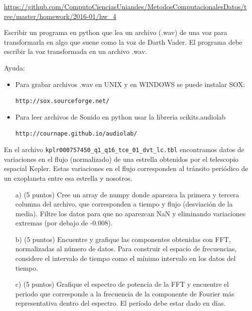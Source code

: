 \documentclass[11pt,letterpaper]{exam}
\begin{document}
\noindent
\url{https://github.com/ComputoCienciasUniandes/MetodosComputacionalesDatos/tree/master/homework/2016-01/hw_4} 
\begin{questions}




Escribir un programa en python que lea un archivo (.wav) de una
voz para transformarla en algo que suene como la voz de Darth Vader. El programa debe escribir la voz transformada en un archivo .wav.

Ayuda:
\begin{itemize}
\item Para grabar archivos .wav en UNIX y en WINDOWS  se puede
  instalar SOX:
  
  
  \verb"http://sox.sourceforge.net/"
  
\item 
  Para leer archivos de Sonido en python usar la libreria
  scikits.audiolab
  
  
 \verb"http://cournape.github.io/audiolab/"
\end{itemize}



En el archivo \texttt{kplr000757450\_q1\_q16\_tce\_01\_dvt\_lc.tbl} encontramos datos de variaciones en el flujo (normalizado) de una estrella obtenidos por el telescopio espacial Kepler. Estas variaciones en el flujo  corresponden al tr\'ansito peri\'odico de un exoplaneta entre esa estrella y nosotros.

\begin{itemize}
\item[a)] (5 puntos) Cree un array de numpy donde aparezca la primera y tercera columna del archivo, que corresponden a tiempo y flujo (desviación de la media). Filtre los datos para que no aparezcan NaN y eliminando variaciones extremas (por debajo de -0.008).


\item[b)] (5 puntos) Encuentre y grafique las componentes obtenidas con FFT, normalizadas al n\'umero de datos. Para construir el espacio de frecuencias, considere el intervalo de tiempo como el mínimo intervalo en los datos del tiempo.

\item[c)] (5 puntos) Grafique el espectro de potencia de la FFT y encuentre el periodo que corresponde a la frecuencia de la componente de Fourier más representativa dentro del espectro. El per\'iodo debe estar dado en d\'ias. 


\end{itemize}
\end{questions}
\end{document}

